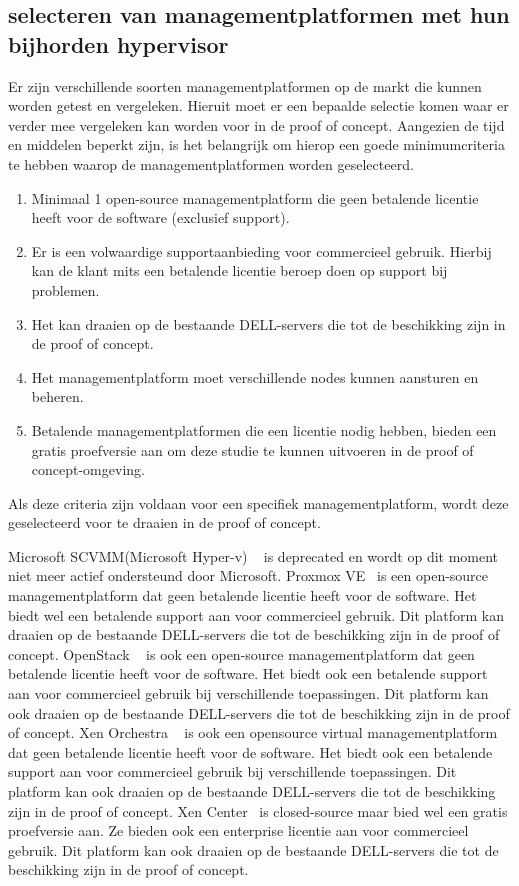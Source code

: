 \subsection{selecteren van managementplatformen met hun bijhorden hypervisor}
Er zijn verschillende soorten managementplatformen op de markt die kunnen worden getest en vergeleken. Hieruit moet er een bepaalde selectie komen waar er verder mee vergeleken kan worden voor in de proof of concept.
Aangezien de tijd en middelen beperkt zijn, is het belangrijk om hierop een goede minimumcriteria te hebben waarop de managementplatformen worden geselecteerd.

\begin{enumerate}
\item Minimaal 1 open-source managementplatform die geen betalende licentie heeft voor de software (exclusief support).
\item Er is een volwaardige supportaanbieding voor commercieel gebruik. Hierbij kan de klant mits een betalende licentie beroep doen op support bij problemen.
\item Het kan draaien op de bestaande DELL-servers die tot de beschikking zijn in de proof of concept.
\item Het managementplatform moet verschillende nodes kunnen aansturen en beheren.
\item Betalende managementplatformen die een licentie nodig hebben, bieden een gratis proefversie aan om deze studie te kunnen uitvoeren in de proof of concept-omgeving.
\end{enumerate}
Als deze criteria zijn voldaan voor een specifiek managementplatform, wordt deze geselecteerd voor te draaien in de proof of concept.

Microsoft SCVMM(Microsoft Hyper-v) ~\autocite{Eaton2019} is deprecated en wordt op dit moment niet meer actief ondersteund door Microsoft.
Proxmox VE~\autocite{Proxmox} is een open-source managementplatform dat geen betalende licentie heeft voor de software. Het biedt wel een betalende support aan voor commercieel gebruik. Dit platform kan draaien op de bestaande DELL-servers die tot de beschikking zijn in de proof of concept.
OpenStack ~\autocite{openstack2024} is ook een open-source managementplatform dat geen betalende licentie heeft voor de software. Het biedt ook een betalende support aan voor commercieel gebruik bij verschillende toepassingen. Dit platform kan ook draaien op de bestaande DELL-servers die tot de beschikking zijn in de proof of concept.
Xen Orchestra ~\autocite{el2021server} is ook een opensource virtual managementplatform dat geen betalende licentie heeft voor de software. Het biedt ook een betalende support aan voor commercieel gebruik bij verschillende toepassingen. Dit platform kan ook draaien op de bestaande DELL-servers die tot de beschikking zijn in de proof of concept.
Xen Center~\autocite{xencenter2024}  is closed-source maar bied wel een gratis proefversie aan. Ze bieden ook een enterprise licentie aan voor commercieel gebruik. Dit platform kan ook draaien op de bestaande DELL-servers die tot de beschikking zijn in de proof of concept.

